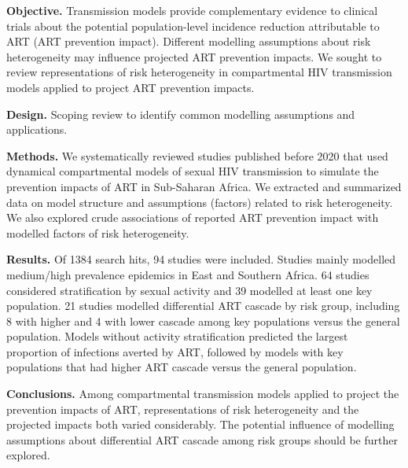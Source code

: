 \par\textbf{Objective.}
Transmission models provide complementary evidence to clinical trials about
the potential population-level incidence reduction attributable to ART
(ART prevention impact). %
Different modelling assumptions about risk heterogeneity may influence
projected ART prevention impacts.
We sought to review representations of risk heterogeneity in compartmental HIV transmission models
applied to project ART prevention impacts.
\par\textbf{Design.}
Scoping review to identify common modelling assumptions and applications.
\par\textbf{Methods.}
We systematically reviewed studies published before 2020 that used 
dynamical compartmental models of sexual HIV transmission
to simulate the prevention impacts of ART in Sub-Saharan Africa.
We extracted and summarized data on model structure and assumptions (factors) related to risk heterogeneity.
We also explored crude associations of reported ART prevention impact with modelled factors of risk heterogeneity.
\par\textbf{Results.}
Of 1384 search hits, 94 studies were included.
Studies mainly modelled medium/high prevalence epidemics in East and Southern Africa.
64 studies considered stratification by sexual activity and 39 modelled at least one key population.
21 studies modelled differential ART cascade by risk group,
including 8 with higher and 4 with lower cascade among key populations versus the general population.
Models without activity stratification predicted the largest proportion of infections averted by ART,
followed by models with key populations that had higher ART cascade versus the general population.
\par\textbf{Conclusions.}
Among compartmental transmission models applied to project the prevention impacts of ART,
representations of risk heterogeneity and the projected impacts both varied considerably.
The potential influence of modelling assumptions about
differential ART cascade among risk groups should be further explored.
